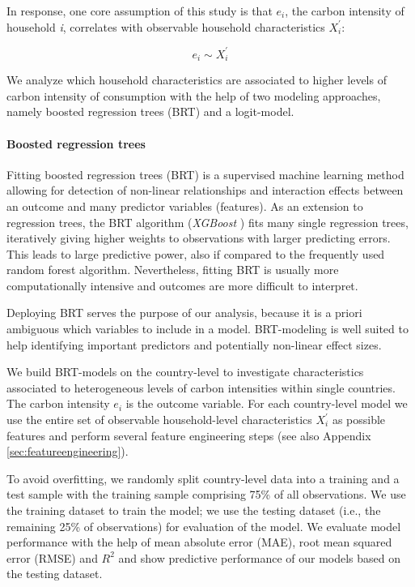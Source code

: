 \documentclass[12pt, a4paper]{article}
\begin{document}
In response, one core assumption of this study is that $e_{i}$, the carbon intensity of household \textit{i}, correlates with observable household characteristics $X_{i}^{'}$:

\begin{equation}
    e_{i} \sim X_{i}^{'}
\end{equation}


We analyze which household characteristics are associated to higher levels of carbon intensity of consumption with the help of two modeling approaches, namely boosted regression trees (BRT) and a logit-model.

\paragraph{Boosted regression trees} Fitting boosted regression trees (BRT) \autocite{Friedman.2003, Elith.2008} is a supervised machine learning method allowing for detection of non-linear relationships and interaction effects between an outcome and many predictor variables (features). As an extension to regression trees, the BRT algorithm (\textit{XGBoost} \autocite{Chen.2016}) fits many single regression trees, iteratively giving higher weights to observations with larger predicting errors. This leads to large predictive power, also if compared to the frequently used random forest algorithm. Nevertheless, fitting BRT is usually more computationally intensive and outcomes are more difficult to interpret. %

Deploying BRT serves the purpose of our analysis, because it is a priori ambiguous which variables to include in a model. BRT-modeling is well suited to help identifying important predictors and potentially non-linear effect sizes.

We build BRT-models on the country-level to investigate characteristics associated to heterogeneous levels of carbon intensities within single countries. The carbon intensity $e_{i}$ is the outcome variable. For each country-level model we use the entire set of observable household-level characteristics $X_{i}^{'}$ as possible features and perform several feature engineering steps (see also Appendix \ref{sec:featureengineering}).

To avoid overfitting, we randomly split country-level data into a training and a test sample with the training sample comprising 75\% of all observations. We use the training dataset to train the model; we use the testing dataset (i.e., the remaining 25\% of observations) for evaluation of the model. We evaluate model performance with the help of mean absolute error (MAE), root mean squared error (RMSE) and $R^{2}$ and show predictive performance of our models based on the testing dataset.
\end{document}
